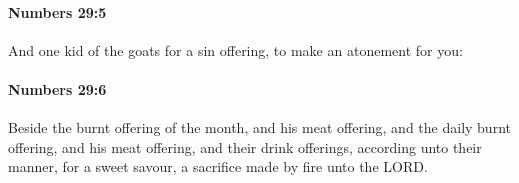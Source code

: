 		\paragraph{Numbers 29:5} %
			\label{NUMBERS-29-5}

			And one kid of the goats for a sin offering, to make an atonement for you:


		\paragraph{Numbers 29:6} %
			\label{NUMBERS-29-6}

			Beside the burnt offering of the month, and his meat offering, and the daily burnt offering, and his meat offering, and their drink offerings, according unto their manner, for a sweet savour, a sacrifice made by fire unto the LORD.


